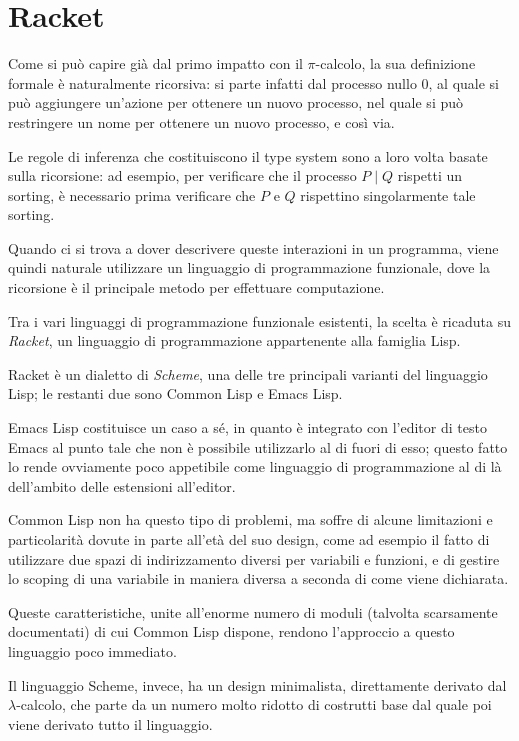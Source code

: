 \section{Racket}

Come si pu\`o capire gi\`a dal primo impatto con il $\pi$-calcolo, la
sua definizione formale \`e naturalmente ricorsiva: si parte infatti dal
processo nullo $0$, al quale si pu\`o aggiungere un'azione per ottenere
un nuovo processo, nel quale si pu\`o restringere un nome per ottenere un
nuovo processo, e cos\`i via.

Le regole di inferenza che costituiscono il type system sono a loro volta
basate sulla ricorsione: ad esempio, per verificare che il processo
$P \; | \; Q$ rispetti un sorting, \`e necessario prima verificare che
$P$ e $Q$ rispettino singolarmente tale sorting.

Quando ci si trova a dover descrivere queste interazioni in un programma,
viene quindi naturale utilizzare un linguaggio di programmazione
funzionale, dove la ricorsione \`e il principale metodo per effettuare
computazione.

Tra i vari linguaggi di programmazione funzionale esistenti, la scelta
\`e ricaduta su \emph{Racket}, un linguaggio di programmazione
appartenente alla famiglia Lisp.

Racket \`e un dialetto di \emph{Scheme}, una delle tre principali
varianti del linguaggio Lisp; le restanti due sono Common Lisp e Emacs
Lisp.

Emacs Lisp costituisce un caso a s\'e, in quanto \`e integrato con
l'editor di testo Emacs al punto tale che non \`e possibile
utilizzarlo al di fuori di esso; questo fatto lo rende ovviamente poco
appetibile come linguaggio di programmazione al di l\`a dell'ambito
delle estensioni all'editor.

Common Lisp non ha questo tipo di problemi, ma soffre di alcune
limitazioni e particolarit\`a dovute in parte all'et\`a del suo design,
come ad esempio il fatto di utilizzare due spazi di indirizzamento
diversi per variabili e funzioni, e di gestire lo scoping di una
variabile in maniera diversa a seconda di come viene dichiarata.

Queste caratteristiche, unite all'enorme numero di moduli (talvolta
scarsamente documentati) di cui Common Lisp dispone, rendono l'approccio
a questo linguaggio poco immediato.

Il linguaggio Scheme, invece, ha un design minimalista, direttamente
derivato dal $\lambda$-calcolo, che parte da un numero molto ridotto di
costrutti base dal quale poi viene derivato tutto il linguaggio.

